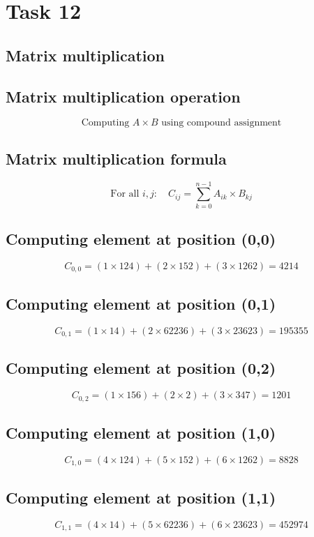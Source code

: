 \documentclass{article}
\begin{document}
\hrulefill
\bigskip

\section*{Task 12}

\subsection*{Matrix multiplication}
\subsection*{ \vspace{1em} Matrix multiplication operation}
\[
\text{Computing } A \times B \text{ using compound assignment}
\]
\subsection*{ \vspace{1em} Matrix multiplication formula}
\[
\text{For all } i,j: \quad C_{ij} = \sum_{k=0}^{n-1} A_{ik} \times B_{kj}
\]
\subsection*{ \vspace{1em} Computing element at position (0,0)}
\[
C_{0,0} = (1 \times 124) + (2 \times 152) + (3 \times 1262) = 4214
\]
\subsection*{ \vspace{1em} Computing element at position (0,1)}
\[
C_{0,1} = (1 \times 14) + (2 \times 62236) + (3 \times 23623) = 195355
\]
\subsection*{ \vspace{1em} Computing element at position (0,2)}
\[
C_{0,2} = (1 \times 156) + (2 \times 2) + (3 \times 347) = 1201
\]
\subsection*{ \vspace{1em} Computing element at position (1,0)}
\[
C_{1,0} = (4 \times 124) + (5 \times 152) + (6 \times 1262) = 8828
\]
\subsection*{ \vspace{1em} Computing element at position (1,1)}
\[
C_{1,1} = (4 \times 14) + (5 \times 62236) + (6 \times 23623) = 452974
\]
\end{document}
